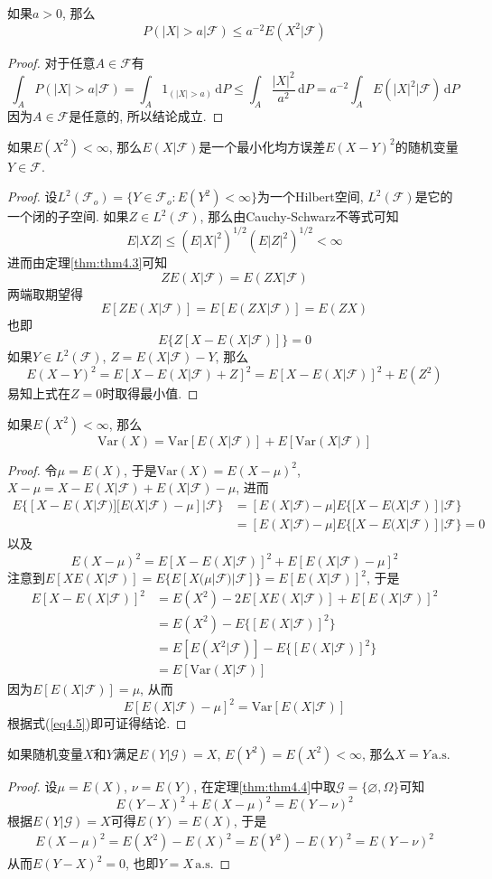 \documentclass[cn, 12pt, math=mtpro2, bibstyle=apa, blue, twocol]{elegantbook}
\newcommand{\F}{\mathcal{F}}
\newcommand{\G}{\mathcal{G}}
\let\emptyset\varnothing
\begin{document}
\begin{theorem}[Chebyshev不等式]
  如果$a>0$, 那么
  $$P(|X|>a|\F)\leq a^{-2}E(X^2|\F)$$
\end{theorem}
\begin{proof}
  对于任意$A\in\F$有
  $$\int_AP(|X|>a|\F)=\int_A1_{(|X|>a)}\,\text{d}P\leq \int_A\frac{|X|^2}{a^2}\,\text{d}P=a^{-2}\int_AE(|X|^2|\F)\,\text{d}P$$
  因为$A\in\F$是任意的, 所以结论成立.
\end{proof}

\begin{theorem}
  如果$E(X^2)<\infty$, 那么$E(X|\F)$是一个最小化均方误差$E(X-Y)^2$的随机变量$Y\in\F$.
\end{theorem}
\begin{proof}
  设$L^2(\F_o)=\{Y\in \F_o: E(Y^2)<\infty\}$为一个Hilbert空间, $L^2(\F)$是它的一个闭的子空间. 如果$Z\in L^2(\F)$, 那么由Cauchy-Schwarz不等式可知
  $$E|XZ|\leq (E|X|^2)^{1/2}(E|Z|^2)^{1/2}<\infty$$
  进而由定理\ref{thm:thm4.3}可知
  $$ZE(X|\F)=E(ZX|\F)$$
  两端取期望得
  $$E[ZE(X|\F)]=E[E(ZX|\F)]=E(ZX)$$
  也即
  $$E\{Z[X-E(X|\F)]\}=0$$
  如果$Y\in L^2(\F)$, $Z=E(X|\F)-Y$, 那么
  $$E(X-Y)^2=E[X-E(X|\F)+Z]^2=E[X-E(X|\F)]^2+E(Z^2)$$
  易知上式在$Z=0$时取得最小值.
\end{proof}
\begin{theorem}\label{thm:thm4.4}
  如果$E(X^2)<\infty$, 那么
  $$\text{Var}(X)=\text{Var}[E(X|\F)]+E[\text{Var}(X|\F)]$$
\end{theorem}
\begin{proof}
  令$\mu=E(X)$, 于是$\text{Var}(X)=E(X-\mu)^2$, $X-\mu=X-E(X|\F)+E(X|\F)-\mu$, 进而
  \begin{align*}
  E\{[X-E(X|\F)][E(X|\F)-\mu]|\F\}&=[E(X|\F)-\mu]E\{[X-E(X|\F)]|\F\} \\
  &=[E(X|\F)-\mu]E\{[X-E(X|\F)]|\F\}=0
  \end{align*}
  以及
  \begin{equation}\label{eq4.5}
    E(X-\mu)^2=E[X-E(X|\F)]^2+E[E(X|\F)-\mu]^2
  \end{equation}
  注意到$E[XE(X|\F)]=E\{E[X(\mu|\F)|\F]\}=E[E(X|\F)]^2$, 于是
  \begin{align*}
  E[X-E(X|\F)]^2&=E(X^2)-2E[XE(X|\F)]+E[E(X|\F)]^2 \\
  &=E(X^2)-E\{[E(X|\F)]^2\} \\
  &=E[E(X^2|\F)]-E\{[E(X|\F)]^2\} \\
  &=E[\text{Var}(X|\F)]
  \end{align*}
  因为$E[E(X|\F)]=\mu$, 从而
  $$E[E(X|\F)-\mu]^2=\text{Var}[E(X|\F)]$$
  根据式(\ref{eq4.5})即可证得结论.
\end{proof}

\begin{example}
如果随机变量$X$和$Y$满足$E(Y|\G)=X$, $E(Y^2)=E(X^2)<\infty$, 那么$X=Y\,\text{a.s.}$
\end{example}
\begin{proof}
  设$\mu=E(X)$, $\nu=E(Y)$, 在定理\ref{thm:thm4.4}中取$\G=\{\emptyset,\Omega\}$可知
  $$E(Y-X)^2+E(X-\mu)^2=E(Y-\nu)^2$$
  根据$E(Y|\G)=X$可得$E(Y)=E(X)$, 于是
  \begin{align*}
  E(X-\mu)^2=E(X^2)-E(X)^2=E(Y^2)-E(Y)^2=E(Y-\nu)^2
  \end{align*}
  从而$E(Y-X)^2=0$, 也即$Y=X\,\text{a.s.}$
\end{proof}
\end{document}
